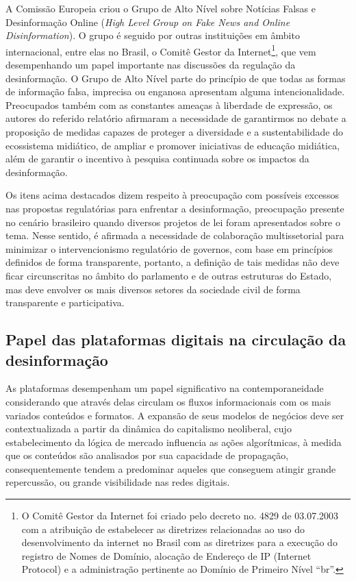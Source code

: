 A Comissão Europeia criou o Grupo de Alto Nível sobre Notícias Falsas e
Desinformação Online (\emph{High Level Group on Fake News and Online
Disinformation}). O grupo é seguido por outras instituições em âmbito
internacional, entre elas no Brasil, o Comitê Gestor da
Internet\footnote{O Comitê Gestor da Internet foi criado pelo decreto
  no. 4829 de 03.07.2003 com a atribuição de estabelecer as diretrizes
  relacionadas ao uso do desenvolvimento da internet no Brasil com as
  diretrizes para a execução do registro de Nomes de Domínio, alocação
  de Endereço de IP (Internet Protocol) e a administração pertinente ao
  Domínio de Primeiro Nível ``br''.}, que vem desempenhando um papel
importante nas discussões da regulação da desinformação. O Grupo de Alto
Nível parte do princípio de que todas as formas de informação falsa,
imprecisa ou enganosa apresentam alguma intencionalidade. Preocupados
também com as constantes ameaças à liberdade de expressão, os autores do
referido relatório afirmaram a necessidade de garantirmos no debate a
proposição de medidas capazes de proteger a diversidade e a
sustentabilidade do ecossistema midiático, de ampliar e promover
iniciativas de educação midiática, além de garantir o incentivo à
pesquisa continuada sobre os impactos da desinformação.

Os itens acima destacados dizem respeito à preocupação com possíveis
excessos nas propostas regulatórias para enfrentar a desinformação,
preocupação presente no cenário brasileiro quando diversos projetos de
lei foram apresentados sobre o tema. Nesse sentido, é afirmada a
necessidade de colaboração multissetorial para minimizar o
intervencionismo regulatório de governos, com base em princípios
definidos de forma transparente, portanto, a definição de tais medidas
não deve ficar circunscritas no âmbito do parlamento e de outras
estruturas do Estado, mas deve envolver os mais diversos setores da
sociedade civil de forma transparente e participativa.

\subsection{Papel das plataformas digitais na circulação da desinformação}

As plataformas desempenham um papel significativo na contemporaneidade
considerando que através delas circulam os fluxos informacionais com os
mais variados conteúdos e formatos. A expansão de seus modelos de
negócios deve ser contextualizada a partir da dinâmica do capitalismo
neoliberal, cujo estabelecimento da lógica de mercado influencia as
ações algorítmicas, à medida que os conteúdos são analisados por sua
capacidade de propagação, consequentemente tendem a predominar aqueles
que conseguem atingir grande repercussão, ou grande visibilidade nas
redes digitais.

